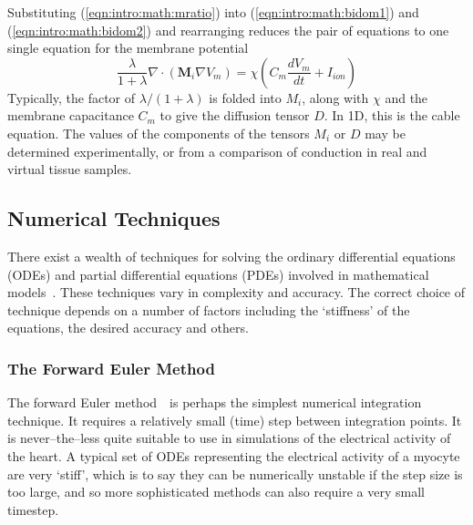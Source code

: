 Substituting (\ref{eqn:intro:math:mratio}) into (\ref{eqn:intro:math:bidom1})
and (\ref{eqn:intro:math:bidom2}) and rearranging reduces the pair of equations
to one single equation for the membrane potential
\begin{equation}
\frac{\lambda}{1+\lambda}\nabla\cdot\left(\mathbf{M}_{i}\nabla V_{m}\right) = \chi \left( C_{m}\frac{dV_{m}}{dt} + I_{ion}\right)
\label{eqn:intro:math:mono}
\end{equation}
Typically, the factor of ${\lambda}/\left({1+\lambda}\right)$ is folded into
$M_{i}$, along with $\chi$ and the membrane capacitance $C_m$ to give the diffusion tensor $D$.
In 1D, this is the cable equation.
The values of the components of the tensors $M_{i}$ or $D$ may be determined experimentally, or from a comparison of conduction in real and virtual tissue samples.

\subsection{Numerical Techniques}

There exist a wealth of techniques for solving the ordinary differential
equations (ODEs) and partial differential equations (PDEs) involved in
mathematical models~\cite{Sundnes2006}.
These techniques vary in complexity and accuracy.
The correct choice of technique depends on a number of factors including the
`stiffness' of the equations, the desired accuracy and others.

\subsubsection{The Forward Euler Method}

The forward Euler method~\cite{Birkhoff1989}\ is perhaps the simplest numerical
integration technique.
It requires a relatively small (time) step between integration points.
It is never--the--less quite suitable to use in simulations of the electrical
activity of the heart.
A typical set of ODEs representing the electrical activity of a myocyte are very
`stiff', which is to say they can be numerically unstable if the step size is
too large, and so more sophisticated methods can also require a very small
timestep.


